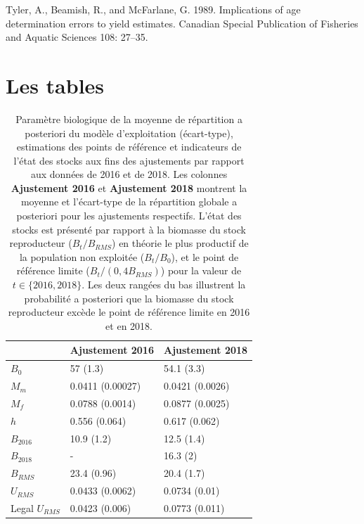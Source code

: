 \documentclass[11pt]{book}
\begin{document}
\leavevmode\hypertarget{ref-tyler1989implications}{}%
Tyler, A., Beamish, R., and McFarlane, G. 1989. Implications of age determination errors to yield estimates. Canadian Special Publication of Fisheries and Aquatic Sciences 108: 27--35.

\setlength{\parindent}{0in} 
\setlength{\leftskip}{0in} 
\setlength{\parskip}{4pt}

\newpage
\setcounter{table}{0}

\hypertarget{les-tables}{%
\section{Les tables}\label{les-tables}}

\begingroup\fontsize{12}{14}\selectfont
\begingroup\fontsize{12}{14}\selectfont
\begin{longtable}[t]{lll}
\caption{\label{tab:unnamed-chunk-5}Paramètre biologique de la moyenne de répartition a posteriori du modèle d’exploitation (écart-type), estimations des points de référence et indicateurs de l’état des stocks aux fins des ajustements par rapport aux données de 2016 et de 2018. Les colonnes \textbf{Ajustement 2016} et \textbf{Ajustement 2018} montrent la moyenne et l’écart-type de la répartition globale a posteriori pour les ajustements respectifs. L’état des stocks est présenté par rapport à la biomasse du stock reproducteur ($B_t/B_{RMS}$) en théorie le plus productif de la population non exploitée ($B_t/B_0 $), et le point de référence limite ($B_t/(0,4B_{RMS})$) pour la valeur de $t \in \{2016, 2018\}$. Les deux rangées du bas illustrent la probabilité a posteriori que la biomasse du stock reproducteur excède le point de référence limite en 2016 et en 2018.}\\
\toprule
\textbf{ } & \textbf{Ajustement 2016} & \textbf{Ajustement 2018}\\
\midrule
$B_0$ & 57 (1.3) & 54.1 (3.3)\\
$M_m$ & 0.0411 (0.00027) & 0.0421 (0.0026)\\
$M_f$ & 0.0788 (0.0014) & 0.0877 (0.0025)\\
$h$ & 0.556 (0.064) & 0.617 (0.062)\\
$B_{2016}$ & 10.9 (1.2) & 12.5 (1.4)\\
$B_{2018}$ & - & 16.3 (2)\\
$B_{RMS}$ & 23.4 (0.96) & 20.4 (1.7)\\
$U_{RMS}$ & 0.0433 (0.0062) & 0.0734 (0.01)\\
Legal $U_{RMS}$ & 0.0423 (0.006) & 0.0773 (0.011)\\

\end{longtable}
\end{document}
